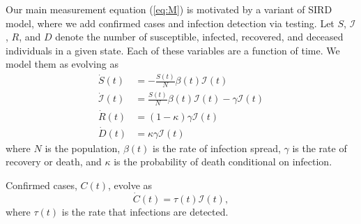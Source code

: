 \documentclass[11pt,reqno,letter]{amsart}
\theoremstyle{definition}
\providecommand{\Infected}{{\mathcal{I}}}
\providecommand{\Recovered}{{R}}
\begin{document}
 Our main measurement equation (\ref{eq:M}) is motivated by a variant of SIRD
model, where we add confirmed cases and infection detection via testing.
Let $S$, $\Infected$, $\Recovered$, and $D$ denote the number of susceptible,
infected, recovered, and deceased individuals in a given state. Each of these variables are a function of time. We model
them as evolving as
\begin{align}
  \dot{S}(t) & = -\frac{S(t)}{N} \beta(t) \Infected(t) \label{eq:s} \\
  \dot{\Infected}(t) & = \frac{S(t)}{N} \beta(t) \Infected(t) - \gamma  \Infected(t) \label{eq:i}\\
  \dot{\Recovered}(t) & = (1-\kappa) \gamma  \Infected(t) \label{eq:r}\\ %
  \dot{D}(t) & = \kappa \gamma \Infected(t) %
  \label{eq:d}
\end{align}
where $N$ is the population, $\beta(t)$ is the rate of infection
spread, $\gamma$ is the rate of recovery or death, and $\kappa$ is the
probability of death conditional on infection.

Confirmed cases, $C(t)$, evolve as
\begin{equation}
  \dot{C}(t) = \tau(t) \Infected(t), \label{eq:c}
\end{equation}
where $\tau(t)$ is the rate that infections are detected.
\end{document}
